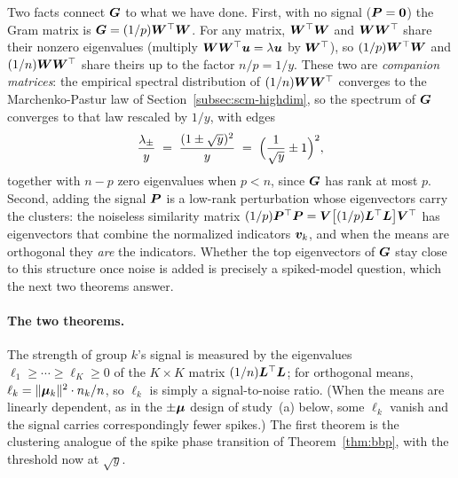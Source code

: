 Two facts connect \(\bm{G}\) to what we have done. First, with no signal (\(\bm{P} = \bm{0}\)) the Gram matrix is \(\bm{G} = (1/p)\bm{W}^{\top}\bm{W}\). For any matrix, \(\bm{W}^{\top}\bm{W}\) and \(\bm{W}\bm{W}^{\top}\) share their nonzero eigenvalues (multiply \(\bm{W}\bm{W}^{\top}\bm{u} = \lambda\bm{u}\) by \(\bm{W}^{\top}\)), so \((1/p)\bm{W}^{\top}\bm{W}\) and \((1/n)\bm{W}\bm{W}^{\top}\) share theirs up to the factor \(n/p = 1/y\). These two are \emph{companion matrices}: the empirical spectral distribution of \((1/n)\bm{W}\bm{W}^{\top}\) converges to the Marchenko-Pastur law of Section~\ref{subsec:scm-highdim}, so the spectrum of \(\bm{G}\) converges to that law rescaled by \(1/y\), with edges
\[
  \frac{\lambda_\pm}{y} \;=\; \frac{(1 \pm \sqrt{y})^2}{y} \;=\; \Bigl(\frac{1}{\sqrt{y}} \pm 1\Bigr)^{2},
\]
together with \(n - p\) zero eigenvalues when \(p < n\), since \(\bm{G}\) has rank at most \(p\). Second, adding the signal \(\bm{P}\) is a low-rank perturbation whose eigenvectors carry the clusters: the noiseless similarity matrix \((1/p)\bm{P}^{\top}\bm{P} = \bm{V}\bigl[(1/p)\bm{L}^{\top}\bm{L}\bigr]\bm{V}^{\top}\) has eigenvectors that combine the normalized indicators \(\bm{v}_k\), and when the means are orthogonal they \emph{are} the indicators. Whether the top eigenvectors of \(\bm{G}\) stay close to this structure once noise is added is precisely a spiked-model question, which the next two theorems answer.

\paragraph{The two theorems.}
The strength of group \(k\)'s signal is measured by the eigenvalues \(\ell_1 \ge \cdots \ge \ell_K \ge 0\) of the \(K \times K\) matrix \((1/n)\bm{L}^{\top}\bm{L}\); for orthogonal means, \(\ell_k = \lVert\bm{\mu}_k\rVert^2 \cdot n_k / n\), so \(\ell_k\) is simply a signal-to-noise ratio. (When the means are linearly dependent, as in the \(\pm\bm{\mu}\) design of study~(a) below, some \(\ell_k\) vanish and the signal carries correspondingly fewer spikes.) The first theorem is the clustering analogue of the spike phase transition of Theorem~\ref{thm:bbp}, with the threshold now at \(\sqrt{y}\).

